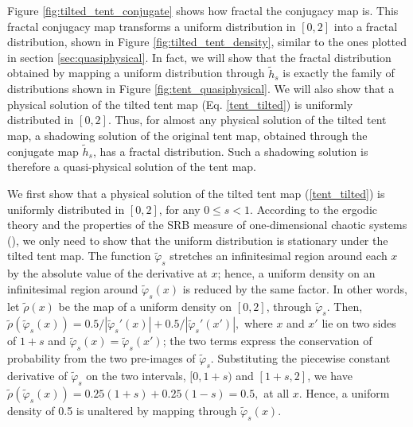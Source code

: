 Figure \ref{fig:tilted_tent_conjugate} shows how fractal the conjugacy map is.
This fractal conjugacy map transforms a uniform distribution in $[0,2]$ into
a fractal distribution, shown in Figure \ref{fig:tilted_tent_density},
similar to the ones plotted in section \ref{sec:quasiphysical}.
In fact, we will show that the fractal distribution obtained by mapping a uniform
distribution through $\tilde{h}_s$ is exactly the family of distributions
shown in Figure \ref{fig:tent_quasiphysical}.  We will also show that
a physical solution of the tilted tent map (Eq. \ref{tent_tilted}) is uniformly
distributed in $[0,2]$.  Thus, for almost any physical solution of the
tilted tent map, a shadowing solution of the original tent map, obtained
through the conjugate map $\tilde{h}_s$, has a fractal distribution.
Such a shadowing solution is therefore a quasi-physical solution of
the tent map.

We first show that a physical solution of the tilted tent map 
(\ref{tent_tilted}) is uniformly distributed in $[0,2]$, for
any $0\le s<1$.
According to the ergodic theory and the properties of the SRB measure of 
one-dimensional chaotic systems (\cite{young}), 
we only need to show that the uniform
distribution is stationary under the tilted tent map.
The function $\tilde{\varphi}_s$ stretches an infinitesimal
region around each $x$ by the absolute value of the derivative at $x$; 
hence, a uniform density on an infinitesimal region around $\tilde{\varphi}_s(x)$ 
is reduced by the same factor. In other words, let $\tilde{\rho}(x)$ 
be the map of a uniform density on $[0,2]$, through $\tilde{\varphi}_s$. Then, 
$\tilde{\rho}(\tilde{\varphi}_s (x)) = 0.5/|\tilde \varphi_s'(x)| + 0.5/|\tilde \varphi_s'(x')|,$ where
$x$ and $x'$ lie on two sides of $1+s$ and
$\tilde{\varphi}_s(x)=\tilde{\varphi}_s(x')$; the two terms express the conservation of probability 
from the two pre-images of $\tilde{\varphi}_s$. Substituting the piecewise constant 
derivative of $\tilde{\varphi}_s$ on the two intervals, $[0,1+s)$ and $[1+s,2]$,
we have $\tilde{\rho}(\tilde{\varphi}_s (x)) = 0.25(1+s) + 0.25(1-s) = 0.5,$ at 
all $x.$ Hence, a uniform density of 0.5 is unaltered by mapping through 
$\tilde\varphi_s(x)$.

